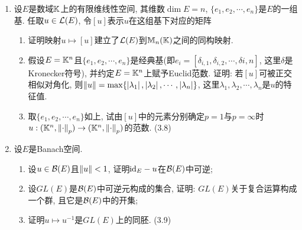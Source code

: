 	\begin{enumerate}[label=\textbf{\arabic*.}, ref=\arabic*]
	\item 设$ E $是数域$ \mathbb{K} $上的有限维线性空间, 其维数$ \dim E=n $, $ \{ e_1,e_2,\cdots,e_n \} $是$ E $的一组基. 任取$ u\in\mathcal{L}(E) $, 令$ [u] $表示$ u $在这组基下对应的矩阵
		\begin{enumerate}[(1)]
		\item 证明映射$ u\mapsto[u] $建立了$ \mathcal{L}(E) $到$ \mathbb{M}_n(\mathbb{K}) $之间的同构映射.
		\item 假设$ E=\mathbb{K}^n $且$ \{ e_1,e_2,\cdots,e_n \} $是经典基(即$ e_i=[\delta_{i,1},\delta_{i,2},\cdots,\delta{i,n}] $, 这里$ \delta $是Kronecker符号), 并约定$ E=\mathbb{K}^n $上赋予Euclid范数. 证明: 若$ [u] $可被正交相似对角化, 则$ \left\| u \right\|=\max\{ \left| \lambda_1 \right| ,\left| \lambda_2 \right| ,\cdots,\left| \lambda_n \right|  \} $, 这里$ \lambda_1,\lambda_2,\cdots,\lambda_n $是$ u $的特征值.
		\item 取$ \{ e_1,e_2,\cdots,e_n \} $如上, 试由$ [u] $中的元素分别确定$ p=1 $与$ p=\infty $时$ u : (\mathbb{K}^n,\left\| \cdot \right\|_p)\to(\mathbb{K}^n,\left\| \cdot \right\|_p) $的范数. (3.8)
		\end{enumerate}
	\item 设$ E $是Banach空间.
		\begin{enumerate}[(1)]
		\item 设$ u\in\mathcal{B}(E) $且$ \left\| u \right\|<1 $, 证明$ \mathrm{id}_E-u $在$ \mathcal{B}(E) $中可逆;
		\item 设$ GL(E) $是$ \mathcal{B}(E) $中可逆元构成的集合, 证明: $ GL(E) $关于复合运算构成一个群, 且它是$ \mathcal{B}(E) $中的开集;
		\item 证明$ u\mapsto u^{-1} $是$ GL(E) $上的同胚. (3.9)
		\end{enumerate}
	\end{enumerate}
	

